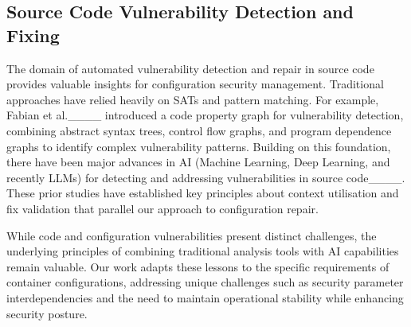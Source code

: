 \subsection{Source Code Vulnerability Detection and Fixing}
The domain of automated vulnerability detection and repair in source code provides valuable insights for configuration security management. Traditional approaches have relied heavily on SATs and pattern matching. For example, Fabian et al.____ introduced a code property graph for vulnerability detection, combining abstract syntax trees, control flow graphs, and program dependence graphs to identify complex vulnerability patterns.
Building on this foundation, there have been major advances in AI (Machine Learning, Deep Learning, and recently LLMs) for detecting and addressing vulnerabilities in source code____. These prior studies have established key principles about context utilisation and fix validation that parallel our approach to configuration repair.

While code and configuration vulnerabilities present distinct challenges, the underlying principles of combining traditional analysis tools with AI capabilities remain valuable. Our work adapts these lessons to the specific requirements of container configurations, addressing unique challenges such as security parameter interdependencies and the need to maintain operational stability while enhancing security posture.